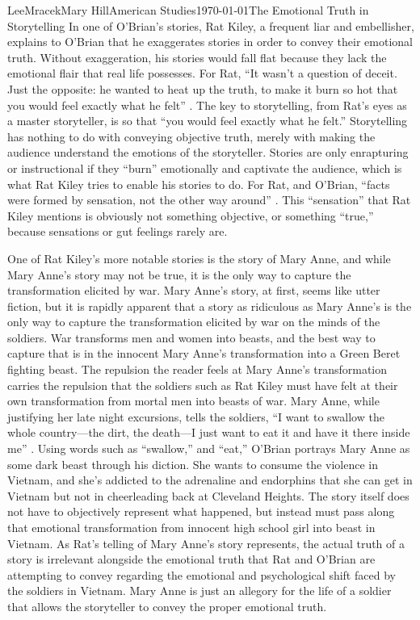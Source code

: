 \documentclass[letterpaper, 11pt]{article}
\begin{document}
\begin{mla}{Lee}{Mracek}{Mary Hill}{American Studies}{\today}{The Emotional Truth in Storytelling}
    In one of O'Brian's stories, Rat Kiley, a frequent liar and embellisher, explains to O'Brian that he exaggerates stories in order to convey their emotional truth. Without exaggeration, his stories would fall flat because they lack the emotional flair that real life possesses. For Rat, ``It wasn't a question of deceit. Just the opposite: he wanted to heat up the truth, to make it burn so hot that you would feel exactly what he felt'' \cite[89]{TTTC}. The key to storytelling, from Rat's eyes as a master storyteller, is so that ``you would feel exactly what he felt.'' Storytelling has nothing to do with conveying objective truth, merely with making the audience understand the emotions of the storyteller. Stories are only enrapturing or instructional if they ``burn'' emotionally and captivate the audience, which is what Rat Kiley tries to enable his stories to do. For Rat, and O'Brian, ``facts were formed by sensation, not the other way around'' \cite[89]{TTTC}. This ``sensation'' that Rat Kiley mentions is obviously not something objective, or something ``true,'' because sensations or gut feelings rarely are.

    One of Rat Kiley's more notable stories is the story of Mary Anne, and while Mary Anne's story may not be true, it is the only way to capture the transformation elicited by war. Mary Anne's story, at first, seems like utter fiction, but it is rapidly apparent that a story as ridiculous as Mary Anne's is the only way to capture the transformation elicited by war on the minds of the soldiers. War transforms men and women into beasts, and the best way to capture that is in the innocent Mary Anne's transformation into a Green Beret fighting beast. The repulsion the reader feels at Mary Anne's transformation carries the repulsion that the soldiers such as Rat Kiley must have felt at their own transformation from mortal men into beasts of war. Mary Anne, while justifying her late night excursions, tells the soldiers, ``I want to swallow the whole country---the dirt, the death---I just want to eat it and have it there inside me'' \cite[111]{TTTC}. Using words such as ``swallow,'' and ``eat,'' O'Brian portrays Mary Anne as some dark beast through his diction. She wants to consume the violence in Vietnam, and she's addicted to the adrenaline and endorphins that she can get in Vietnam but not in cheerleading back at Cleveland Heights. The story itself does not have to objectively represent what happened, but instead must pass along that emotional transformation from innocent high school girl into beast in Vietnam. As Rat's telling of Mary Anne's story represents, the actual truth of a story is irrelevant alongside the emotional truth that Rat and O'Brian are attempting to convey regarding the emotional and psychological shift faced by the soldiers in Vietnam. Mary Anne is just an allegory for the life of a soldier that allows the storyteller to convey the proper emotional truth.


\end{mla}
\end{document}
